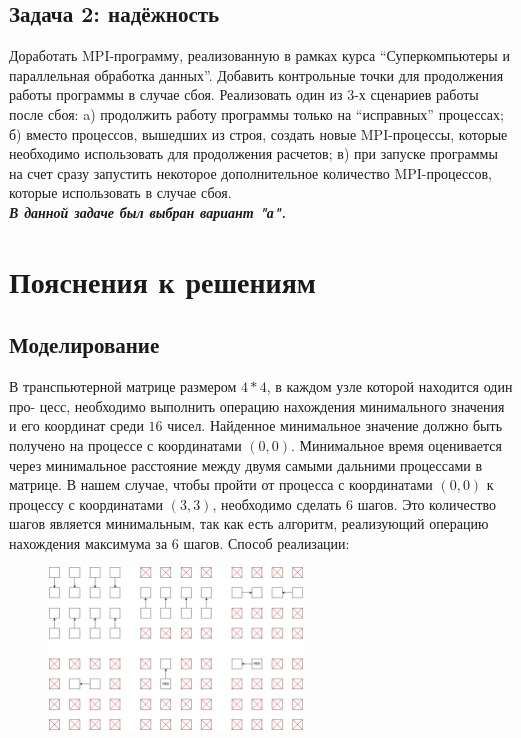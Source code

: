 \documentclass[a4paper]{article}
\begin{document}
\subsection{Задача 2: надёжность}
Доработать MPI-программу, реализованную в рамках курса “Суперкомпьютеры и параллельная обработка данных”. Добавить контрольные точки для продолжения работы программы в случае сбоя. Реализовать один из 3-х сценариев работы после сбоя: a) продолжить работу программы только на “исправных” процессах; б) вместо процессов, вышедших из строя, создать новые MPI-процессы, которые необходимо использовать для продолжения расчетов; в) при запуске программы на счет сразу запустить некоторое дополнительное количество MPI-процессов, которые использовать в случае сбоя.\\
\textit{\textbf{В данной задаче был выбран вариант "а".}}
\newpage

\section{Пояснения к решениям}
\subsection{Моделирование}
В транспьютерной матрице размером $4*4$, в каждом узле которой находится один про-
цесс, необходимо выполнить операцию нахождения минимального значения и его координат среди $16$ чисел. Найденное минимальное значение должно быть получено
на процессе с координатами $(0,0)$.
Минимальное время оценивается через минимальное расстояние между двумя самыми дальними процессами в матрице. В нашем случае, чтобы пройти от процесса с
координатами $(0, 0)$ к процессу с координатами $(3, 3)$, необходимо сделать $6$ шагов. Это
количество шагов является минимальным, так как есть алгоритм, реализующий операцию нахождения максимума за $6$ шагов. Способ реализации:

\begin{figure}[htbp]
  \centering
  \includegraphics[width=0.6\textwidth]{graph}
\end{figure}
\end{document}
